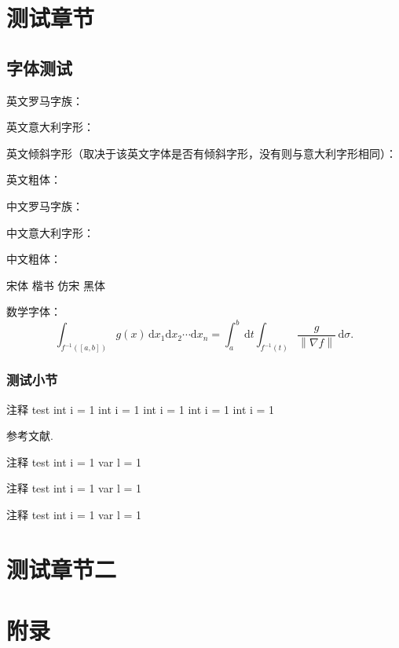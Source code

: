\documentclass[codepkg=minted,theme=fancy,twoside]{course-report}
\begin{document}
\chapter{测试章节}
\section{字体测试}

英文罗马字族：\\
\lipsum[1]

英文意大利字形：\\
{\itshape \lipsum[1] }

英文倾斜字形（取决于该英文字体是否有倾斜字形，没有则与意大利字形相同）：\\
{\slshape \lipsum[1]}

英文粗体：\\
{\bfseries \lipsum[1]}

中文罗马字族：\\
\zhlipsum[1]

中文意大利字形：\\
{\itshape \zhlipsum[1] }

中文粗体：\\
{\bfseries \zhlipsum[1] }

{\songti 宋体} {\kaishu 楷书} {\fangsong 仿宋} {\heiti 黑体}

数学字体：
\[
    \int_{f^{ - 1}([a,b])} g(x)\,\mathrm{d}x_1\mathrm{d}x_2\cdots\mathrm{d}x_n =\int_a^b\,\mathrm{d}t\int_{f^{ - 1}(t)}\frac{g}{\left\|\nabla f\right\|}\,\mathrm{d}\sigma.
\]

\subsection{测试小节}

\zhlipsum[1-2]\zhlipsum[1]
\begin{codebox}{注释 test}\label{box:1.1}
int i = 1 
int i = 1    
int i = 1    
int i = 1    
int i = 1    
\end{codebox}
参考文献.


\begin{codebox}[minted language=csharp]{注释 test}\label{box:1.2}
    int i = 1    
    var l = 1
\end{codebox}

\begin{codebox}{注释 test}\label{box:1.3}
    int i = 1    
    var l = 1
\end{codebox}

\begin{codebox*}{注释 test}
    int i = 1    
    var l = 1
\end{codebox*}

\chapter{测试章节二}


\appendix
\chapter{附录}

\nocite{*}
\end{document}
